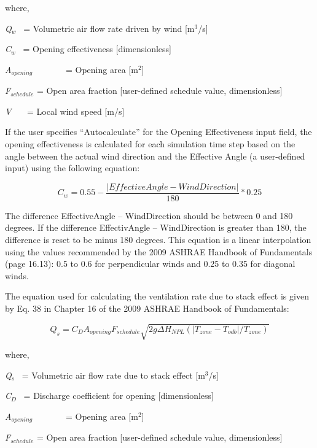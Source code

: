 where,

\emph{Q\(_{w}\)}~ = Volumetric air flow rate driven by wind {[}m\(^{3}\)/s{]}

\emph{C\(_{w}\)}~ = Opening effectiveness {[}dimensionless{]}

\emph{A\(_{opening}\)}~~~~~~~ = Opening area {[}m\(^{2}\){]}

\emph{F\(_{schedule}\)} = Open area fraction {[}user-defined schedule value, dimensionless{]}

\emph{V}~~~ = Local wind speed {[}m/s{]}

If the user specifies ``Autocalculate'' for the Opening Effectiveness input field, the opening effectiveness is calculated for each simulation time step based on the angle between the actual wind direction and the Effective Angle (a user-defined input) using the following equation:

\begin{equation}
{C_w} = 0.55 - \frac{{\left| {EffectiveAngle - WindDirection} \right|}}{{180}}*0.25
\end{equation}

The difference \textbar{}EffectiveAngle -- WindDirection\textbar{} should be between 0 and 180 degrees. If the difference \textbar{}EffectivAngle -- WindDirection\textbar{} is greater than 180, the difference is reset to be minus 180 degrees. This equation is a linear interpolation using the values recommended by the 2009 ASHRAE Handbook of Fundamentals (page 16.13): 0.5 to 0.6 for perpendicular winds and 0.25 to 0.35 for diagonal winds.

The equation used for calculating the ventilation rate due to stack effect is given by Eq. 38 in Chapter 16 of the 2009 ASHRAE Handbook of Fundamentals:

\begin{equation}
{Q_s} = {C_D}{A_{opening}}{F_{schedule}}\sqrt {2g\Delta {H_{NPL}}(|{T_{zone}} - {T_{odb}}|/{T_{zone}})}
\end{equation}

where,

\emph{Q\(_{s}\)}~ = Volumetric air flow rate due to stack effect {[}m\(^{3}\)/s{]}

\emph{C\(_{D}\)}~ = Discharge coefficient for opening {[}dimensionless{]}

\emph{A\(_{opening}\)}~~~~~~~ = Opening area {[}m\(^{2}\){]}

\emph{F\(_{schedule}\)} = Open area fraction {[}user-defined schedule value, dimensionless{]}

